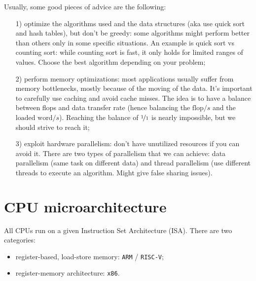 Usually, some good pieces of advice are the following:
\begin{itemize}
    \item [1)] optimize the algorithms used and the data structures (aka use quick sort and hash tables), but don't be greedy: some algorithms might perform better than others only in some specific situations. An example is quick sort vs counting sort: while counting sort is fast, it only holds for limited ranges of values. Choose the best algorithm depending on your problem;
    \item [2)] perform memory optimizations: most applications usually suffer from memory bottlenecks, mostly because of the moving of the data. It's important to carefully use caching and avoid cache misses. The idea is to have a balance between flops and data transfer rate (hence balancing the $\text{flop}/s$ and the $\text{loaded word}/s$). Reaching the balance of $\nicefrac{1}{1}$ is nearly impossible, but we should strive to reach it;
    \item [3)] exploit hardware parallelism: don't have unutilized resources if you can avoid it. There are two types of parallelism that we can achieve: data parallelism (same task on different data) and thread parallelism (use different threads to execute an algorithm. Might give false sharing issues).
\end{itemize}

\section{CPU microarchitecture}

All CPUs run on a given Instruction Set Architecture (ISA). There are two categories:
\begin{itemize}
    \item register-based, load-store memory: \verb|ARM| / \verb|RISC-V|;
    \item register-memory architecture: \verb|x86|.
\end{itemize}

